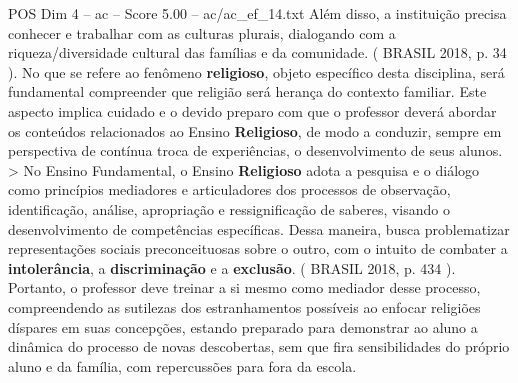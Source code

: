 \begin{textsample}{POS Dim 4 – ac – Score 5.00 – ac/ac\_ef\_14.txt}
Além disso, a instituição precisa conhecer e trabalhar com as culturas plurais, dialogando com a riqueza/diversidade cultural das famílias e da comunidade. ( BRASIL 2018, p. 34 ).
No que se refere ao fenômeno \textbf{religioso}, objeto específico desta disciplina, será fundamental compreender que religião será herança do contexto familiar.
Este aspecto implica cuidado e o devido preparo com que o professor deverá abordar os conteúdos relacionados ao Ensino \textbf{Religioso}, de modo a conduzir, sempre em perspectiva de contínua troca de experiências, o desenvolvimento de seus alunos. > No Ensino Fundamental, o Ensino \textbf{Religioso} adota a pesquisa e o diálogo como princípios mediadores e articuladores dos processos de observação, identificação, análise, apropriação e ressignificação de saberes, visando o desenvolvimento de competências específicas.
Dessa maneira, busca problematizar representações sociais preconceituosas sobre o outro, com o intuito de combater a \textbf{intolerância}, a \textbf{discriminação} e a \textbf{exclusão}. ( BRASIL 2018, p. 434 ).
Portanto, o professor deve treinar a si mesmo como mediador desse processo, compreendendo as sutilezas dos estranhamentos possíveis ao enfocar religiões díspares em suas concepções, estando preparado para demonstrar ao aluno a dinâmica do processo de novas descobertas, sem que fira sensibilidades do próprio aluno e da família, com repercussões para fora da escola.

\end{textsample}
